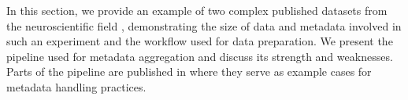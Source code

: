 In this section, we provide an example of two complex published datasets from the neuroscientific field \citep{Brochier_2018}, demonstrating the size of data and metadata involved in such an experiment and the workflow used for data preparation. We present the pipeline used for metadata aggregation and discuss its strength and weaknesses. Parts of the pipeline are published in \cite{Zehl_2016} where they serve as example cases for metadata handling practices.


% 
% 
% 
% 


% 
% 
% 
% 
% 




